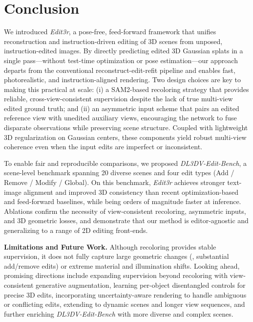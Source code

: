 \documentclass[10pt,twocolumn,letterpaper]{article}
\newcommand{\ourmethod}{\textit{Edit3r}}
\newcommand{\ourbench}{\textit{DL3DV-Edit-Bench}}
\begin{document}
\section{Conclusion}
We introduced \ourmethod, a pose-free, feed-forward framework that unifies reconstruction and instruction-driven editing of 3D scenes from unposed, instruction-edited images. By directly predicting edited 3D Gaussian splats in a single pass—without test-time optimization or pose estimation—our approach departs from the conventional reconstruct-edit-refit pipeline and enables fast, photorealistic, and instruction-aligned rendering. Two design choices are key to making this practical at scale: (i) a SAM2-based recoloring strategy that provides reliable, cross-view-consistent supervision despite the lack of true multi-view edited ground truth; and (ii) an asymmetric input scheme that pairs an edited reference view with unedited auxiliary views, encouraging the network to fuse disparate observations while preserving scene structure. Coupled with lightweight 3D regularization on Gaussian centers, these components yield robust multi-view coherence even when the input edits are imperfect or inconsistent.

To enable fair and reproducible comparisons, we proposed {\ourbench}, a scene-level benchmark spanning 20 diverse scenes and four edit types (Add / Remove / Modify / Global). On this benchmark, {\ourmethod} achieves stronger text-image alignment and improved 3D consistency than recent optimization-based and feed-forward baselines, while being orders of magnitude faster at inference. Ablations confirm the necessity of view-consistent recoloring, asymmetric inputs, and 3D geometric losses, and demonstrate that our method is editor-agnostic and generalizing to a range of 2D editing front-ends.

\vspace{1mm}
\noindent\textbf{Limitations and Future Work.}
Although recoloring provides stable supervision, it does not fully capture large geometric changes (\eg, substantial add/remove edits) or extreme material and illumination shifts. Looking ahead, promising directions include expanding supervision beyond recoloring with view-consistent generative augmentation, learning per-object disentangled controls for precise 3D edits, incorporating uncertainty-aware rendering to handle ambiguous or conflicting edits, extending to dynamic scenes and longer view sequences, and further enriching {\ourbench} with more diverse and complex scenes.
\end{document}
